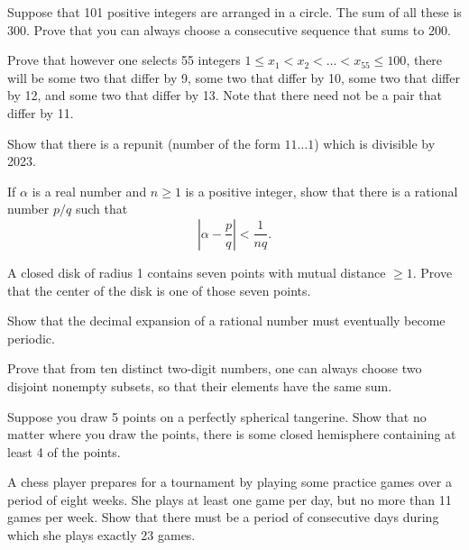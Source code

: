 \documentclass{article}
\begin{document}
\begin{exercise}
    Suppose that 101 positive integers are arranged in a circle.
    The sum of all these is 300.
    Prove that you can always choose a consecutive sequence that sums to 200.
\end{exercise}

\begin{exercise}
    Prove that however one selects 55 integers \(1\leq x_1 < x_2 < \ldots < x_{55} \leq 100\), there will be some two that differ by 9, some two that differ by 10, some two that differ by 12, and some two that differ by 13.
    Note that there need not be a pair that differ by 11.
\end{exercise}

\begin{exercise}
    Show that there is a repunit (number of the form \(11\ldots 1\)) which is divisible by 2023.
\end{exercise}

\begin{exercise}
    If \(\alpha\) is a real number and \(n\geq 1\) is a positive integer, show that there is a rational number \(p/q\) such that
    \[\left|\alpha-\frac{p}{q}\right|<\frac{1}{nq}.\]
\end{exercise}

\begin{exercise}
    A closed disk of radius 1 contains seven points with mutual distance \(\geq 1\).
    Prove that the center of the disk is one of those seven points.
\end{exercise}

\begin{exercise}
    Show that the decimal expansion of a rational number must eventually become periodic.
\end{exercise}

\begin{exercise}
    Prove that from ten distinct two-digit numbers, one can always choose two disjoint nonempty subsets, so that their elements have the same sum.
\end{exercise}

\begin{exercise} %
    Suppose you draw 5 points on a perfectly spherical tangerine.
    Show that no matter where you draw the points, there is some closed hemisphere containing at least 4 of the points.
\end{exercise}

\begin{exercise}
    A chess player prepares for a tournament by playing some practice games over a period of eight weeks. 
    She plays at least one game per day, but no more than 11 games per week. 
    Show that there must be a period of consecutive days during which she plays exactly 23 games.
\end{exercise}
\end{document}
